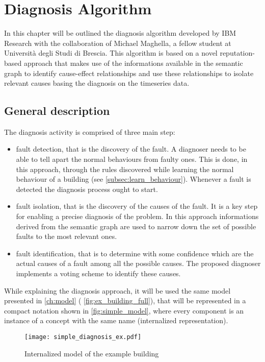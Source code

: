 \chapter{Diagnosis Algorithm} \label{ch:diagnosis}
In this chapter will be outlined the diagnosis algorithm\cite{semantic_diagnoser} developed by IBM Research with the collaboration of Michael Maghella, a fellow student at Università degli Studi di Brescia. This algorithm is based on a novel reputation-based approach that makes use of the informations available in the semantic graph to identify cause-effect relationships and use these relationships to isolate relevant causes basing the diagnosis on the timeseries data.
\section{General description}
The diagnosis activity is comprised of three main step:
\begin{itemize}
  \item fault detection, that is the discovery of the fault. A diagnoser needs to be able to tell apart the normal behaviours from faulty ones. This is done, in this approach, through the rules discovered while learning the normal behaviour of a building (see \autoref{subsec:learn_behaviour}). Whenever a fault is detected the diagnosis process ought to start.
  \item fault isolation, that is the discovery of the causes of the fault. It is a key step for enabling a precise diagnosis of the problem. In this approach informations derived from the semantic graph are used to narrow down the set of possible faults to the most relevant ones.
  \item fault identification, that is to determine with some confidence which are the actual causes of a fault among all the possible causes. The proposed diagnoser implements a voting scheme to identify these causes.
\end{itemize}
While explaining the diagnosis approach, it will be used the same model presented in \autoref{ch:model} ( \autoref{fig:ex_building_full}), that will be represented in a compact notation shown in \autoref{fig:simple_model}, where every component is an instance of a concept with the same name (internalized representation).
\begin{figure}
  \texttt{[image: simple\_diagnosis\_ex.pdf]}
  \caption{Internalized model of the example building}
  \label{fig:simple_model}
\end{figure}
